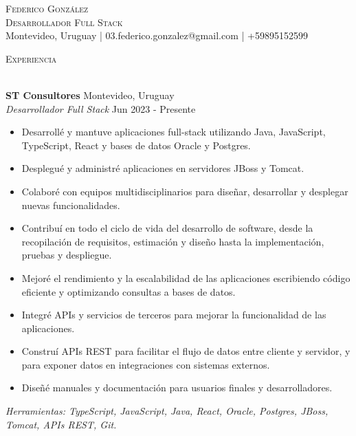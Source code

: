 \documentclass[11pt,a4paper]{article}
\newcommand{\lineunder} {
    \vspace*{-8pt} \\
    \hspace*{-18pt} \hrulefill \\
}
\newcommand{\header} [1] {
    {\hspace*{-18pt}\vspace*{6pt} \textsc{#1}}
    \vspace*{-6pt} \lineunder
}
\begin{document}
\vspace*{-34pt}

    

\vspace*{-10pt}
\begin{center}
	{\Huge \scshape {Federico González}}\\
    {\large \scshape {Desarrollador Full Stack}}\\
	Montevideo, Uruguay | 03.federico.gonzalez@gmail.com | +59895152599\\
\end{center}

\header{Experiencia}
\vspace{0mm}

\textbf{ST Consultores} \hfill Montevideo, Uruguay\\
\textit{Desarrollador Full Stack} \hfill Jun 2023 - Presente\\
\vspace{-1mm}
\begin{itemize} \itemsep -1pt
	\item Desarrollé y mantuve aplicaciones full-stack utilizando Java, JavaScript, TypeScript, React y bases de datos Oracle y Postgres.
	\item Desplegué y administré aplicaciones en servidores JBoss y Tomcat.
	\item Colaboré con equipos multidisciplinarios para diseñar, desarrollar y desplegar nuevas funcionalidades.
	\item Contribuí en todo el ciclo de vida del desarrollo de software, desde la recopilación de requisitos, estimación y diseño hasta la implementación, pruebas y despliegue.
	\item Mejoré el rendimiento y la escalabilidad de las aplicaciones escribiendo código eficiente y optimizando consultas a bases de datos.
	\item Integré APIs y servicios de terceros para mejorar la funcionalidad de las aplicaciones.
	\item Construí APIs REST para facilitar el flujo de datos entre cliente y servidor, y para exponer datos en integraciones con sistemas externos.
	\item Diseñé manuales y documentación para usuarios finales y desarrolladores.
\end{itemize}
\vspace{-1mm}
\textit{Herramientas: TypeScript, JavaScript, Java, React, Oracle, Postgres, JBoss, Tomcat, APIs REST, Git.}
\end{document}
